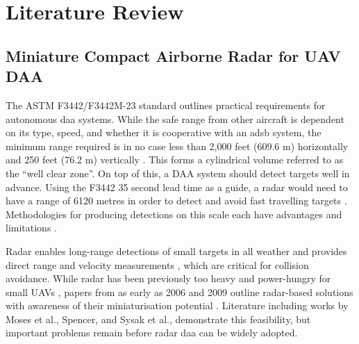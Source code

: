 \chapter{Literature Review}
\label{ch:literature_review}

\section{Miniature Compact Airborne Radar for UAV DAA}
The ASTM F3442/F3442M-23 standard outlines practical requirements for 
autonomous \gls{daa} systems. While the safe range from other 
aircraft is dependent on its type, speed, and whether it is cooperative 
with an \gls{adsb} system, the minimum range required is in no case 
less than 2,000 feet (609.6 m) horizontally and 250 feet (76.2 m) 
vertically \cite{astm_f3442_2023}. This forms a cylindrical volume 
referred to as the ``well clear zone''. On top of this, a DAA system 
should detect targets well in advance. Using the F3442 35 second 
lead time as a guide, a radar would need to have a range of 
6120 metres in order to detect and avoid fast travelling targets 
\cite{Wang2016}. 
Methodologies for 
producing detections on this scale 
each have advantages and limitations \cite{Yasin2020}. 

Radar enables long-range detections of small 
targets in all weather \cite{9635901} and provides direct range and velocity 
measurements \cite{skolnik2001radar}, which are critical for collision avoidance.
While radar has been previously too heavy and power-hungry for small UAVs 
\cite{Lies2020, McLain2015, Wang2016}, papers from as early as 2006 and 
2009 outline 
radar-based solutions with awareness of their miniaturisation potential 
\cite{4148337, 5438372}. 
Literature including works by Moses et al., Spencer, and Sysak et al., 
demonstrate this feasibility, but important problems remain before radar 
\gls{daa} can be widely adopted. 

